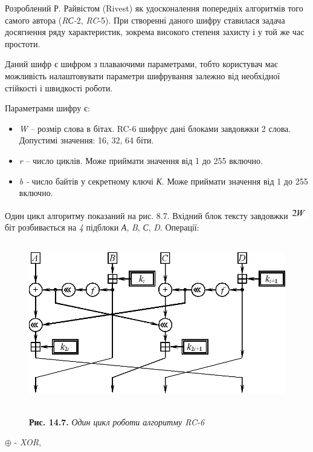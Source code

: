 \documentclass[a4paper]{article}
\newcommand\liststyleWWviiiNumxlii{%
\renewcommand\theenumi{\arabic{enumi}}
\renewcommand\theenumii{\arabic{enumii}}
\renewcommand\theenumiii{\arabic{enumiii}}
\renewcommand\labelitemi{\textlatin{[F0B7?]}}
\renewcommand\labelenumi{\theenumi.}
\renewcommand\labelenumii{\theenumii.}
\renewcommand\labelenumiii{\theenumiii.}
}
\newcounter{}
\begin{document}
\bigskip

Розроблений Р. Райвістом (Rivest) як удосконалення попередніх алгоритмів того
самого автора (\textit{R}\textit{С-}2, \textit{RC}{}-5). При створенні даного
шифру ставилася задача досягнення ряду характеристик, зокрема високого степеня
захисту і у той же час простоти.


\bigskip

Даний шифр є шифром з плаваючими параметрами, тобто користувач має можливість
налаштовувати параметри шифрування залежно від необхідної стійкості і швидкості
роботи.

Параметрами шифру є: 

\liststyleWWviiiNumxlii
\begin{itemize}
\item \textit{W }– розмір слова в бітах. RC-6 шифрує дані блоками завдовжки 2
слова. Допустимі значення: 16, 32, 64 біти.
\item \textit{r }– число циклів. Може приймати значення від 1 до 255 включно.
\item \textit{b}\textit{ }\textit{{}-}\textit{ }число байтів у секретному ключі
\textit{К}. Може приймати значення від 1 до 255 включно.
\end{itemize}
Один цикл алгоритму показаний на рис. 8.7. Вхідний блок тексту завдовжки 
\includegraphics[width=0.2917in,height=0.1937in]{crypt-img/crypt-img304.png} 
біт розбивається на \textit{4 }підблоки \textit{А}, \textit{B}, \textit{С},
\textit{D}. Операції:

\begin{figure}
\centering
\begin{minipage}{}
 \includegraphics[width=4.6146in,height=2.8071in]{crypt-img/crypt-img305.png} 
\end{minipage}
\end{figure}
\begin{figure}
\centering
\begin{minipage}{}
{\centering
\textbf{Рис. 14.7. }\textit{Один цикл роботи алгоритму RC-6}
\par}
\end{minipage}
\end{figure}
  ${{\oplus}}$  {}- \textit{XOR},
\end{document}
